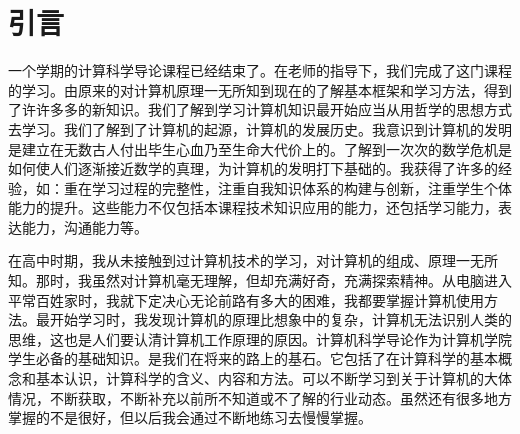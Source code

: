 \documentclass{article}
\begin{document}
\section{引言}
一个学期的计算科学导论课程已经结束了。在老师的指导下，我们完成了这门课程的学习。由原来的对计算机原理一无所知到现在的了解基本框架和学习方法，得到了许许多多的新知识。我们了解到学习计算机知识最开始应当从用哲学的思想方式去学习。我们了解到了计算机的起源，计算机的发展历史。我意识到计算机的发明是建立在无数古人付出毕生心血乃至生命大代价上的。了解到一次次的数学危机是如何使人们逐渐接近数学的真理，为计算机的发明打下基础的。我获得了许多的经验，如：重在学习过程的完整性，注重自我知识体系的构建与创新，注重学生个体能力的提升。这些能力不仅包括本课程技术知识应用的能力，还包括学习能力，表达能力，沟通能力等。\par
在高中时期，我从未接触到过计算机技术的学习，对计算机的组成、原理一无所知。那时，我虽然对计算机毫无理解，但却充满好奇，充满探索精神。从电脑进入平常百姓家时，我就下定决心无论前路有多大的困难，我都要掌握计算机使用方法。最开始学习时，我发现计算机的原理比想象中的复杂，计算机无法识别人类的思维，这也是人们要认清计算机工作原理的原因。计算机科学导论作为计算机学院学生必备的基础知识。是我们在将来的路上的基石。它包括了在计算科学的基本概念和基本认识，计算科学的含义、内容和方法。可以不断学习到关于计算机的大体情况，不断获取，不断补充以前所不知道或不了解的行业动态。虽然还有很多地方掌握的不是很好，但以后我会通过不断地练习去慢慢掌握。
\end{document}
